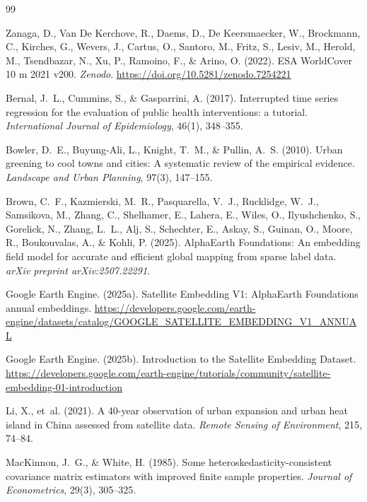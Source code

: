 \documentclass{article}
\begin{document}
\begin{thebibliography}{99}

Zanaga, D., Van De Kerchove, R., Daems, D., De Keersmaecker, W., Brockmann,
C., Kirches, G., Wevers, J., Cartus, O., Santoro, M., Fritz, S.,
Lesiv, M., Herold, M., Tsendbazar, N., Xu, P., Ramoino, F., \& Arino, O.
(2022).
ESA WorldCover 10 m 2021 v200.
\textit{Zenodo}.
\url{https://doi.org/10.5281/zenodo.7254221}

Bernal, J.~L., Cummins, S., \& Gasparrini, A. (2017).
Interrupted time series regression for the evaluation of public health
interventions: a tutorial.
\textit{International Journal of Epidemiology}, 46(1), 348--355.

Bowler, D.~E., Buyung-Ali, L., Knight, T.~M., \& Pullin, A.~S. (2010).
Urban greening to cool towns and cities: A systematic review of the empirical
evidence.
\textit{Landscape and Urban Planning}, 97(3), 147--155.

Brown, C.~F., Kazmierski, M.~R., Pasquarella, V.~J., Rucklidge, W.~J.,
Samsikova, M., Zhang, C., Shelhamer, E., Lahera, E., Wiles, O.,
Ilyushchenko, S., Gorelick, N., Zhang, L.~L., Alj, S., Schechter, E.,
Askay, S., Guinan, O., Moore, R., Boukouvalas, A., \& Kohli, P. (2025).
AlphaEarth Foundations: An embedding field model for accurate and efficient
global mapping from sparse label data.
\textit{arXiv preprint arXiv:2507.22291}.

Google Earth Engine. (2025a).
Satellite Embedding V1: AlphaEarth Foundations annual embeddings.
\url{https://developers.google.com/earth-engine/datasets/catalog/GOOGLE_SATELLITE_EMBEDDING_V1_ANNUAL}

Google Earth Engine. (2025b).
Introduction to the Satellite Embedding Dataset.
\url{https://developers.google.com/earth-engine/tutorials/community/satellite-embedding-01-introduction}

Li, X., et~al. (2021).
A 40-year observation of urban expansion and urban heat island in China
assessed from satellite data.
\textit{Remote Sensing of Environment}, 215, 74--84.

MacKinnon, J.~G., \& White, H. (1985).
Some heteroskedasticity-consistent covariance matrix estimators with improved
finite sample properties.
\textit{Journal of Econometrics}, 29(3), 305--325.


\end{thebibliography}
\end{document}
